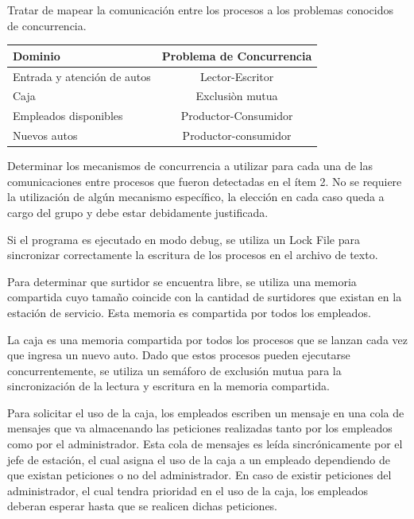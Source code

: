 \documentclass[12pt,a4paper,titlepage,oneside]{article}
\renewenvironment{itemize}{
 \begin{list}{}{
  \setlength{\leftmargin}{1.5em}
 }
}{
 \end{list}
}
\begin{document}
\begin{enumerate}
\item Tratar de mapear la comunicación entre los procesos a los problemas conocidos de concurrencia.

\bigskip
\begin{center}
   \begin{tabular}[1.5\textwidth]{| l | c |}
     \hline
     \textbf{Dominio} & \textbf{Problema de Concurrencia}  \\ \hline
     Entrada y atención de autos & Lector-Escritor  \\ \hline
     Caja & Exclusiòn mutua\\ \hline
     Empleados disponibles & Productor-Consumidor\\ \hline
     Nuevos autos & Productor-consumidor\\ 
     \hline
   \end{tabular}
 \end{center}
 
\newpage
\item Determinar los mecanismos de concurrencia a utilizar para cada una de las comunicaciones entre procesos que fueron detectadas en el ítem 2. No se requiere la utilización de algún mecanismo específico, la elección en cada caso queda a cargo del grupo y debe estar debidamente justificada.

\begin{itemize}
\item[•] Si el programa es ejecutado en modo debug, se utiliza un Lock File para sincronizar correctamente la escritura de los procesos en el archivo de texto.
\item[•] Para determinar que surtidor se encuentra libre, se utiliza una memoria compartida cuyo tamaño coincide con la cantidad de surtidores que existan en la estación de servicio. Esta memoria es compartida por todos los empleados.
\item[•] La caja es una memoria compartida por todos los procesos que se lanzan cada vez que ingresa un nuevo auto. Dado que estos procesos pueden ejecutarse concurrentemente, se utiliza un semáforo de exclusión mutua para la sincronización de la lectura y escritura en la memoria compartida.
\item[•] Para solicitar el uso de la caja, los empleados escriben un mensaje en una cola de mensajes que va almacenando las peticiones realizadas tanto por los empleados como por el administrador. Esta cola de mensajes es leída sincrónicamente por el jefe de estación, el cual asigna el uso de la caja a un empleado dependiendo de que existan peticiones o no del administrador. En caso de existir peticiones del administrador, el cual tendra prioridad en el uso de la caja, los empleados deberan esperar hasta que se realicen dichas peticiones.
\end{itemize}
\end{enumerate}
\end{document}
